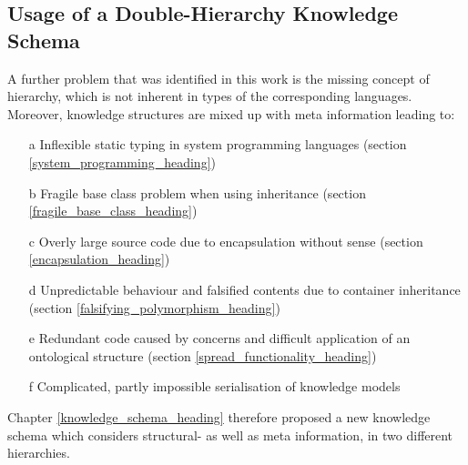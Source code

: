 %
%
%
%
%
%
%

\subsection{Usage of a Double-Hierarchy Knowledge Schema}
\label{usage_of_a_double_hierarchy_knowledge_schema_heading}

A further problem that was identified in this work is the missing concept of
hierarchy, which is not inherent in types of the corresponding languages.
Moreover, knowledge structures are mixed up with meta information leading to:

\begin{itemize}
    \item[a] Inflexible static typing in system programming languages (section
        \ref{system_programming_heading})
    \item[b] Fragile base class problem when using inheritance (section
        \ref{fragile_base_class_heading})
    \item[c] Overly large source code due to encapsulation without sense
        (section \ref{encapsulation_heading})
    \item[d] Unpredictable behaviour and falsified contents due to container
        inheritance (section \ref{falsifying_polymorphism_heading})
    \item[e] Redundant code caused by concerns and difficult application of an
        ontological structure (section \ref{spread_functionality_heading})
    \item[f] Complicated, partly impossible serialisation of knowledge models
\end{itemize}

Chapter \ref{knowledge_schema_heading} therefore proposed a new knowledge
schema which considers structural- as well as meta information, in two
different hierarchies.

